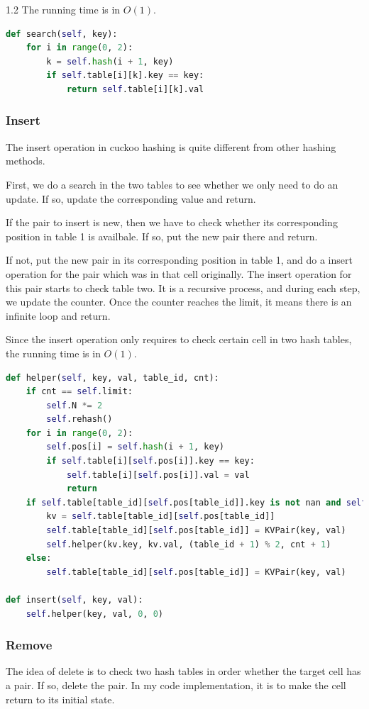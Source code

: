 \documentclass{article}
\begin{document}
\begin{spacing}{1.2}
The running time is in $O(1)$.
\begin{lstlisting}[language=Python]
def search(self, key):
    for i in range(0, 2):
        k = self.hash(i + 1, key)
        if self.table[i][k].key == key:
            return self.table[i][k].val
\end{lstlisting}

\subsubsection{Insert}
The insert operation in cuckoo hashing is quite different from other hashing methods.

First, we do a search in the two tables to see whether we only need to do an update. If so, update the corresponding value and return.

If the pair to insert is new, then we have to check whether its corresponding position in table 1 is availbale. If so, put the new pair there and return.

If not, put the new pair in its corresponding position in table 1, and do a insert operation for the pair which was in that cell originally. The insert operation for this pair starts to check table two. It is a recursive process, and during each step, we update the counter. Once the counter reaches the limit, it means there is an infinite loop and return.

Since the insert operation only requires to check certain cell in two hash tables, the running time is in $O(1)$.
\begin{lstlisting}[language=Python]
def helper(self, key, val, table_id, cnt):
    if cnt == self.limit:
        self.N *= 2
        self.rehash()
    for i in range(0, 2):
        self.pos[i] = self.hash(i + 1, key)
        if self.table[i][self.pos[i]].key == key:
            self.table[i][self.pos[i]].val = val
            return
    if self.table[table_id][self.pos[table_id]].key is not nan and self.table[table_id][self.pos[table_id]].val is not nan:
        kv = self.table[table_id][self.pos[table_id]]
        self.table[table_id][self.pos[table_id]] = KVPair(key, val)
        self.helper(kv.key, kv.val, (table_id + 1) % 2, cnt + 1)
    else:
        self.table[table_id][self.pos[table_id]] = KVPair(key, val)

def insert(self, key, val):
    self.helper(key, val, 0, 0)
\end{lstlisting}

\subsubsection{Remove}
The idea of delete is to check two hash tables in order whether the target cell has a pair. If so, delete the pair. In my code implementation, it is to make the cell return to its initial state. 


\end{spacing}
\end{document}
